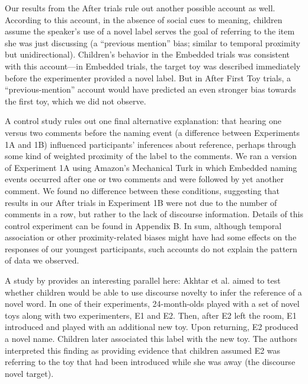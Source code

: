 \documentclass[man]{apa2}
\begin{document}
Our results from the After trials rule out another possible account as well. According to this account, in the absence of social cues to meaning, children assume the speaker's use of a novel label serves the goal of referring to the item she was just discussing (a ``previous mention'' bias; similar to temporal proximity but unidirectional). Children's behavior in the Embedded trials was consistent with this account---in Embedded trials, the target toy was described immediately before the experimenter provided a novel label. But in After First Toy trials, a ``previous-mention'' account would have predicted an even stronger bias towards the first toy, which we did not observe.


A control study rules out one final alternative explanation: that hearing one versus two comments before the naming event (a difference between Experiments 1A and 1B) influenced participants' inferences about reference, perhaps through some kind of weighted proximity of the label to the comments.  We ran a version of Experiment 1A using Amazon's Mechanical Turk in which Embedded naming events occurred after one or two comments and were followed by yet another comment.  We found no difference between these conditions, suggesting that results in our After trials in Experiment 1B were not due to the number of comments in a row, but rather to the lack of discourse information. Details of this control experiment can be found in Appendix B. In sum, although temporal association or other proximity-related biases might have had some effects on the responses of our youngest participants, such accounts do not explain the pattern of data we observed. 

A study by  provides an interesting parallel here: Akhtar et al. aimed to test whether children would be able to use discourse novelty to infer the reference of a novel word. In one of their experiments, 24-month-olds played with a set of novel toys along with two experimenters, E1 and E2. Then, after E2 left the room, E1 introduced and played with an additional new toy. Upon returning, E2 produced a novel name. Children later associated this label with the new toy.  The authors interpreted this finding as providing evidence that children assumed E2 was referring to the toy that had been introduced while she was away (the discourse novel target).
\end{document}
